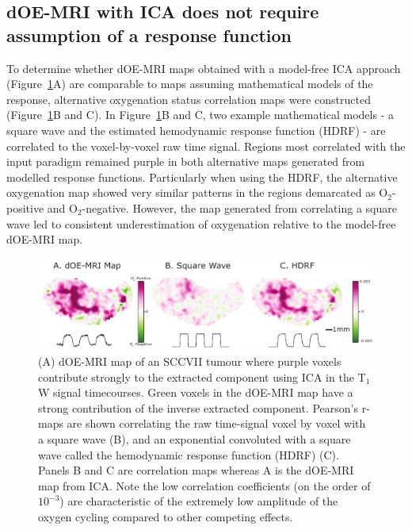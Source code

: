 \subsection{dOE-MRI with \acs{ICA} does not require assumption of a response function}
\label{res2}

To determine whether \acs{dOE-MRI} maps obtained with a model-free \acs{ICA} approach (Figure~\ref{fig_correlation}A) are comparable to maps assuming mathematical models of the response, alternative oxygenation status correlation maps were constructed (Figure~\ref{fig_correlation}B and C). 
In Figure~\ref{fig_correlation}B and C, two example mathematical models - a square wave and the estimated hemodynamic response function (HDRF) - are correlated to the voxel-by-voxel raw time signal. 
Regions most correlated with the input paradigm remained purple in both alternative maps generated from modelled response functions.
Particularly when using the HDRF, the alternative oxygenation map showed very similar patterns in the regions demarcated as O$_2$-positive and O$_2$-negative. 
However, the map generated from correlating a square wave led to consistent underestimation of oxygenation relative to the model-free \acs{dOE-MRI} map.

\begin{figure}[htbp]
   \centering
   \includegraphics[width=\textwidth]{oemri_thesis1/oemri_thesis1-images/fig3_correlation.pdf} %
   \caption{(A) \acs{dOE-MRI} map of an SCCVII tumour where purple voxels contribute strongly to the extracted component using \acs{ICA} in the T$_1$W signal timecourses. 
Green voxels in the \acs{dOE-MRI} map have a strong contribution of the inverse extracted component. Pearson's r-maps are shown correlating the raw time-signal voxel by voxel with a square wave (B), and an exponential convoluted with a square wave called the hemodynamic response function (HDRF) (C).
Panels B and C are correlation maps whereas A is the \acs{dOE-MRI} map from \acs{ICA}. Note the low correlation coefficients (on the order of $10^{-3}$) are characteristic of the extremely low amplitude of the oxygen cycling compared to other competing effects.
   \label{fig_correlation}}
\end{figure}

